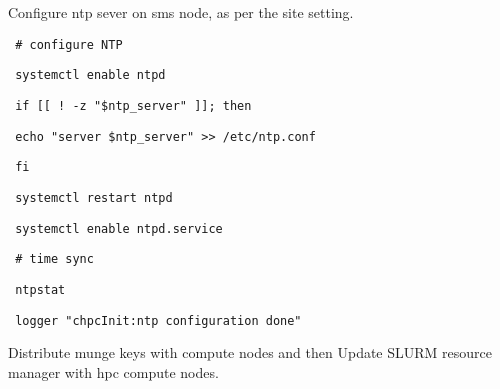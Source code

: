 \documentclass[12pt]{article}
\begin{document}
Configure ntp sever on sms node, as per the site setting.

\begin{bash}\texttt{\small{ \# configure NTP}}\end{bash}
\begin{bash}\texttt{\small{ systemctl enable ntpd}}\end{bash}
\begin{bash}\texttt{\small{ if [[ ! -z "\$ntp\_server" ]]; then}}\end{bash}
\begin{bash}\texttt{\small{    echo "server \${ntp\_server}" >> /etc/ntp.conf}}\end{bash}
\begin{bash}\texttt{\small{ fi}}\end{bash}
\begin{bash}\texttt{\small{ systemctl restart ntpd}}\end{bash}
\begin{bash}\texttt{\small{ systemctl enable ntpd.service}}\end{bash}
\begin{bash}\texttt{\small{ \# time sync}}\end{bash}
\begin{bash}\texttt{\small{ ntpstat}}\end{bash}
\begin{bash}\texttt{\small{ logger "chpcInit:ntp configuration done"}}\end{bash}

Distribute munge keys with compute nodes and then Update SLURM resource manager with hpc compute nodes.
\end{document}
